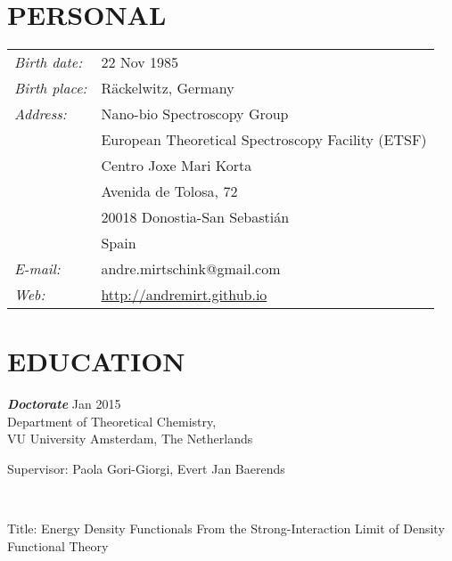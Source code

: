 \documentclass[line,margin]{res}
\begin{document}
 
\begin{resume}
 
\section{PERSONAL}  \medskip
					\begin{tabular}{ll}
					{\sl Birth date:} & 22 Nov 1985 \\
					{\sl Birth place:} & R\"{a}ckelwitz, Germany\\
					{\sl Address:} & Nano-bio Spectroscopy Group\\
					& European Theoretical Spectroscopy Facility (ETSF)\\
					& Centro Joxe Mari Korta\\
					& Avenida de Tolosa, 72\\
					&20018 Donostia-San Sebasti\'{a}n\\
					& Spain\\
					\textit{E-mail:} & andre.mirtschink@gmail.com\\
					\textit{Web:} & \url{http://andremirt.github.io}
					\end{tabular}
 
\section{EDUCATION} {\sl\textbf{Doctorate}} \hfill{} Jan 2015 \\
                \hspace*{1cm} Department of Theoretical Chemistry,\\ 
                \smallskip\hspace*{1cm} VU University Amsterdam, The Netherlands\\
				\hspace*{.5cm}\parbox[t]{12.5cm}{Supervisor: Paola Gori-Giorgi, Evert Jan Baerends}\\
				\hspace*{.5cm}\parbox[t]{12.5cm}{Title: Energy Density Functionals From the Strong-Interaction Limit of Density Functional Theory}%
				

\end{resume}
\end{document}
